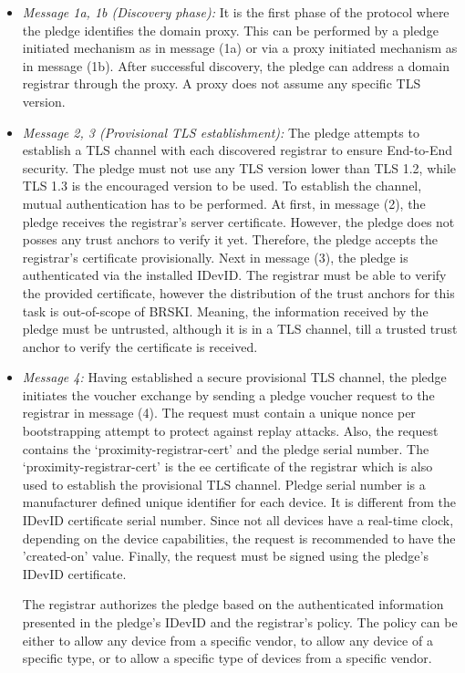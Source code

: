 \begin{itemize}
	\item \textit{Message 1a, 1b (Discovery phase):} It is the first phase of the protocol where the pledge identifies the domain proxy. This can be performed by a pledge initiated mechanism as in message (1a) or via a proxy initiated mechanism as in message (1b). After successful discovery, the pledge can address a domain registrar through the proxy. A proxy does not assume any specific TLS version.

	\item \textit{Message 2, 3 (Provisional TLS establishment):} The pledge attempts to establish a TLS channel with each discovered registrar to ensure End-to-End security. The pledge must not use any TLS version lower than TLS 1.2, while TLS 1.3 is the encouraged version to be used. To establish the channel, mutual authentication has to be performed.
	At first, in message (2), the pledge receives the registrar's server certificate. However, the pledge does not posses any trust anchors to verify it yet. Therefore, the pledge accepts the registrar's certificate provisionally.
	Next in message (3), the pledge is authenticated via the installed IDevID. The registrar must be able to verify the provided certificate, however the distribution of the trust anchors for this task is out-of-scope of BRSKI.
	Meaning, the information received by the pledge must be untrusted, although it is in a TLS channel, till a trusted trust anchor to verify the certificate is received. 

	\item \textit{Message 4:} Having established a secure provisional TLS channel, the pledge initiates the voucher exchange by sending a pledge voucher request to the registrar in message (4). The request must contain a unique nonce per bootstrapping attempt to protect against replay attacks. Also, the request contains the `proximity-registrar-cert' and the pledge serial number.
	The `proximity-registrar-cert' is the \gls{ee} certificate of the registrar which is also used to establish the provisional TLS channel. Pledge serial number is a manufacturer defined unique identifier for each device. It is different from the IDevID certificate serial number. Since not all devices have a real-time clock, depending on the device capabilities, the request is recommended to have the 'created-on' value. Finally, the request must be signed using the pledge's IDevID certificate.
	\par
	The registrar authorizes the pledge based on the authenticated information presented in the pledge's IDevID and the registrar's policy. The policy can be either to allow any device from a specific vendor, to allow any device of a specific type, or to allow a specific type of devices from a specific vendor.
	

\end{itemize}
